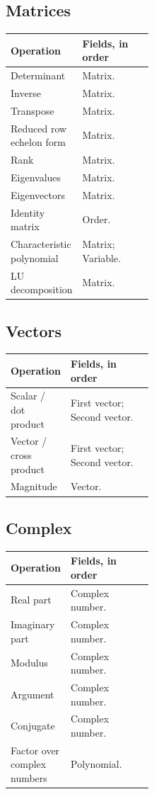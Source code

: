 \subsection{Matrices}
{\small
\begin{tabularx}{\linewidth}{@{}p{0.40\linewidth}X@{}}\toprule
Operation & Fields, in order\\\midrule
Determinant & Matrix.\\[3pt]
Inverse & Matrix.\\[3pt]
Transpose & Matrix.\\[3pt]
Reduced row echelon form & Matrix.\\[3pt]
Rank & Matrix.\\[3pt]
Eigenvalues & Matrix.\\[3pt]
Eigenvectors & Matrix.\\[3pt]
Identity matrix & Order.\\[3pt]
Characteristic polynomial & Matrix; Variable.\\[3pt]
LU decomposition & Matrix.\\[3pt]
\bottomrule\end{tabularx}}
\subsection{Vectors}
{\small
\begin{tabularx}{\linewidth}{@{}p{0.40\linewidth}X@{}}\toprule
Operation & Fields, in order\\\midrule
Scalar / dot product & First vector; Second vector.\\[3pt]
Vector / cross product & First vector; Second vector.\\[3pt]
Magnitude & Vector.\\[3pt]
\bottomrule\end{tabularx}}
\subsection{Complex}
{\small
\begin{tabularx}{\linewidth}{@{}p{0.40\linewidth}X@{}}\toprule
Operation & Fields, in order\\\midrule
Real part & Complex number.\\[3pt]
Imaginary part & Complex number.\\[3pt]
Modulus & Complex number.\\[3pt]
Argument & Complex number.\\[3pt]
Conjugate & Complex number.\\[3pt]
Factor over complex numbers & Polynomial.\\[3pt]
\bottomrule\end{tabularx}}
